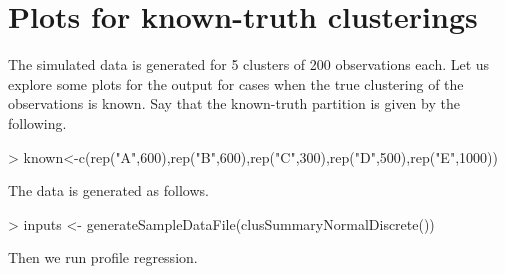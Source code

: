 \documentclass{article}
\begin{document}
\section{Plots for known-truth clusterings}
The simulated data is generated for 5 clusters of 200 observations each. Let us explore some plots for the output for cases when the true clustering of the observations is known. Say that the known-truth partition is given by the following.

\begin{Schunk}
\begin{Sinput}
> known<-c(rep("A",600),rep("B",600),rep("C",300),rep("D",500),rep("E",1000))
\end{Sinput}
\end{Schunk}

The data is generated as follows. 

\begin{Schunk}
\begin{Sinput}
> inputs <- generateSampleDataFile(clusSummaryNormalDiscrete())
\end{Sinput}
\end{Schunk}

Then we run profile regression.
\end{document}
